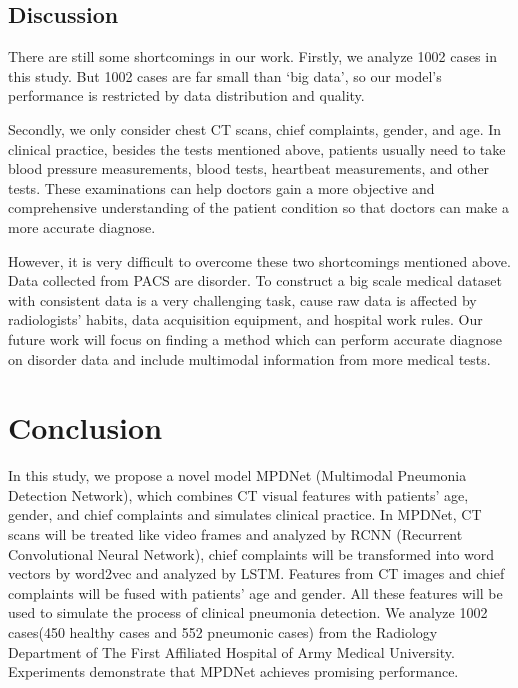 \documentclass[journal]{IEEEtran}
\begin{document}
\subsection{Discussion}
There are still some shortcomings in our work.
Firstly, we analyze 1002 cases in this study. But 1002 cases are far small than `big data', so our model's performance is restricted by data distribution and quality. 

Secondly, we only consider chest CT scans, chief complaints, gender, and age. In clinical practice, besides the tests mentioned above, patients usually need to take blood pressure measurements, blood tests, heartbeat measurements, and other tests. These examinations can help doctors gain a more objective and comprehensive understanding of the patient condition so that doctors can make a more accurate diagnose.

However, it is very difficult to overcome these two shortcomings mentioned above. Data collected from PACS are disorder. To construct a big scale medical dataset with consistent data is a very challenging task, cause raw data is affected by radiologists' habits, data acquisition equipment, and hospital work rules. 
Our future work will focus on finding a method which can perform accurate diagnose on disorder data and include multimodal information from more medical tests.

\section{Conclusion}
\label{conclude}
In this study, we propose a novel model MPDNet (Multimodal Pneumonia Detection Network), which combines CT visual features with patients' age, gender, and chief complaints and simulates clinical practice. In MPDNet, CT scans will be treated like video frames and analyzed by RCNN (Recurrent Convolutional Neural Network), chief complaints will be transformed into word vectors by word2vec and analyzed by LSTM. Features from CT images and chief complaints will be fused with patients' age and gender. All these features will be used to simulate  the process of clinical pneumonia detection.
We analyze 1002 cases(450 healthy cases and 552 pneumonic cases) from the Radiology Department of The First Affiliated Hospital of Army Medical University. Experiments demonstrate that MPDNet achieves promising performance.
\end{document}
